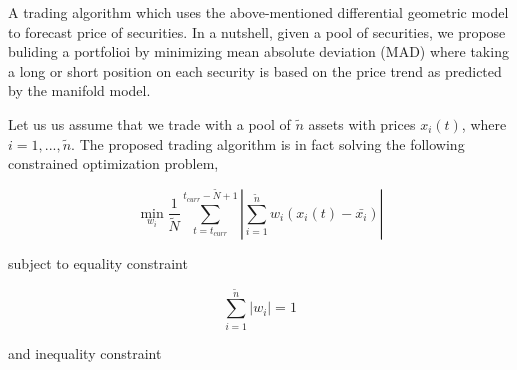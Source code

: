 \documentclass{article}
\begin{document}
A trading algorithm which uses the above-mentioned differential
geometric model to forecast price of securities. In a nutshell, given
a pool of securities, we propose buliding a portfolioi by minimizing
mean absolute deviation (MAD) where taking a long or short position on
each security is based on the price trend as predicted by the manifold
model.

Let us us assume that we trade with a pool of $\tilde{n}$ assets with
prices $x_{i}(t)$, where $i = 1, ...,\tilde{n}$. The proposed trading
algorithm is in fact solving the following constrained optimization
problem,

\begin{equation}\label{eqn:mad-optimization-problem}
\min_{w_{i}} \frac{1}{\tilde{N}}\sum_{t=t_{curr}}^{t_{curr}-\tilde{N}+1}
|\sum_{i=1}^{\tilde{n}} w_{i} (x_{i}(t)-\bar{x_{i}})|
\end{equation}

subject to equality constraint

\begin{equation}\label{eqn:mad-sum-constraint}
\sum_{i=1}^{\tilde{n}} |w_{i}| = 1
\end{equation}

and inequality constraint
\end{document}
